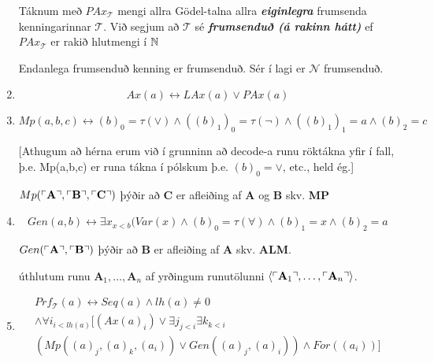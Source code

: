 \documentclass[12pt]{book}
\newcommand{\cT}{\mathcal{T}}
\newcommand{\cN}{\mathcal{N}}
\newcommand{\bA}{\mathbf{A}}
\newcommand{\bB}{\mathbf{B}}
\newcommand{\bC}{\mathbf{C}}
\newcommand{\emphs}[1]{\textbf{\emph{#1}}}
\DeclarePairedDelimiter{\god}{\ulcorner}{\urcorner}
\begin{document}
\begin{enumerate}[(1)]
\begin{ath}
\end{ath}



\begin{skgr}
  Táknum með $PAx_{\cT}$ mengi allra Gödel-talna allra
  \emphs{eiginlegra} frumsenda kenningarinnar $\cT$.
  Við segjum að $\cT$ sé \emphs{frumsenduð (á rakinn hátt)}
  ef $PAx_{\cT}$ er rakið hlutmengi í $\mathbb{N}$
\end{skgr}

\begin{ath}
  Endanlega frumsenduð kenning er frumsenduð. Sér í 
  lagi er $\cN$ frumsenduð.
\end{ath}


\item 

\[Ax(a) \leftrightarrow LAx(a) \vee PAx(a) \]

\item 
\[Mp(a,b,c) \leftrightarrow (b)_0 = \tau(\vee) \wedge ((b)_1)_0 = \tau(\lnot) \wedge ((b)_1)_1 = a \wedge (b)_2 = c\]

[Athugum að hérna erum við í grunninn að decode-a runu röktákna
yfir í fall, þ.e. Mp(a,b,c) er runa tákna í pólskum þ.e.
$(b)_0 = \vee$, etc., held ég.]
\begin{ath}

$Mp(\god{\bA}, \god{\bB},\god{\bC})$ þýðir að $\bC$ er afleiðing af
$\bA$ og $\bB$ skv. \textbf{MP}

\end{ath}

\item 

\[Gen(a,b) \leftrightarrow \exists x_{x < b} (Var(x) \wedge (b)_0 = \tau(\forall) \wedge (b)_1 = x \wedge (b)_2 = a \]

\begin{ath}
  $Gen(\god{\bA},\god{\bB})$ þýðir að $\bB$ er afleiðing af $\bA$
skv. \textbf{ALM}.

úthlutum runu $\bA_1, \dotsc,\bA_n$ af yrðingum runutölunni
$\braket{\god{\bA_1}, \dotsc,\god{\bA_n}}$.

\end{ath}

\item 
  \begin{gather*}
    Prf_{\cT} (a) \leftrightarrow Seq(a) \wedge lh(a) \neq 0 \\
    \wedge \forall i_{i < lh(a)} [ (Ax(a)_i) \vee \exists j_{j < i} \exists k_{k < i}\\
    (Mp((a)_j,(a)_k,(a_i)) \vee Gen((a)_j,(a)_i)) \wedge For((a_i))]
  \end{gather*}


\end{enumerate}
\end{document}
